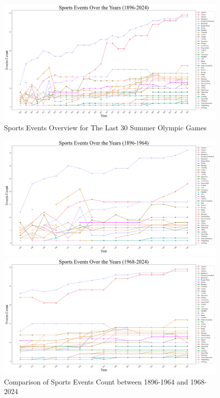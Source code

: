 \documentclass[12pt]{article}
\begin{document}
\begin{figure}[h] 
\centering
\includegraphics[width=14cm]{figure/Sports Events Over the Years (1896-2024).png}
\caption{Sports Events Overview for The Last 30 Summer Olympic Games} \label{fig1}
\end{figure}

\begin{figure}[h]
	\begin{minipage}[b]{0.5\textwidth}
		\centering
		\includegraphics[width=1\textwidth]{figure/Sports Events Over the Years (1896-1964).png}
	\end{minipage}
	\begin{minipage}[b]{0.5\textwidth}
		\centering
		\includegraphics[width=1\textwidth]{figure/Sports Events Over the Years (1968-2024).png}
	\end{minipage}
	\caption{Comparison of Sports Events Count between 1896-1964 and 1968-2024}\label{fig2}
\end{figure}
\end{document}
